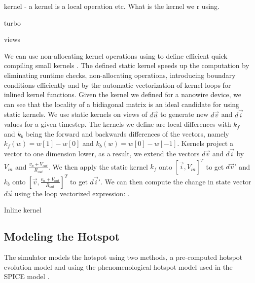 kernel - a kernel is a local operation etc. What is the kernel we r using.

turbo

views

We can use non-allocating kernel operations using  to define efficient
quick compiling small kernels \cite{StaticKernels}. 
The defined static kernel speeds up the computation by eliminating
runtime checks, non-allocating operations, introducing boundary conditions efficiently and 
by the automatic vectorization of kernel loops for inlined kernel functions. Given the kernel
we defined for a nanowire device, we can see that the locality of a bidiagonal matrix is an ideal
candidate for using static kernels. We use static kernels on views of $d\vec u$ to generate
new $d\vec v$ and $d\vec i$ values for a given timestep. The kernels we define are local differences
with $k_f$ and $k_b$ being the forward and backwards differences of the vectors, namely $k_f(w)=w[1]-w[0]$
and $k_b(w)=w[0]-w[-1]$. Kernels project a vector to one dimension lower, as a result, we extend the
vectors $d\vec v$ and $d\vec i$ by $V_{in}$ and $\frac{v_n+V_{out}}{R_{out}}$. We then apply 
the static kernel $k_f$ onto $[\vec i, V_{in}]^T$ to get $d\vec v'$ and 
$k_b$ onto $[\vec v, \frac{v_n+V_{out}}{R_{out}}]^T$ to get $d\vec i'$. We can then compute the change
in state vector $d\vec u$ using the loop vectorized expression: .

Inline kernel

\subsection{Modeling the Hotspot}

The simulator models the hotspot using two methods, a pre-computed hotspot evolution
model and using the phenomenological hotspot model used in the SPICE model \cite{karl_spice, phen_model}. 


